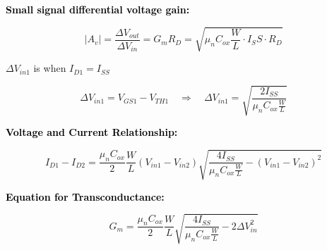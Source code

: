 \newpage

\noindent
\textbf{\textcolor{black}{Small signal differential voltage gain:}}
\begin{tcolorbox}[colback=white,colframe=black,title=]
\begin{equation}
|A_v| = \frac{\Delta V_{out}}{\Delta V_{in}} = G_m R_D = \sqrt{\mu_n C_{ox} \frac{W}{L} \cdot I_SS \cdot R_D}
\end{equation}
\end{tcolorbox}

\vspace{0.5cm}
\noindent
$\Delta V_{in1}$ is when $I_{D1} = I_{SS}$

\[
\Delta V_{in1} = V_{GS1} - V_{TH1}
\quad \Rightarrow \quad 
\Delta V_{in1} = \sqrt{\frac{2 I_{SS}}{\mu_n C_{ox} \frac{W}{L}}}
\]

\vspace{0.3cm}
\textbf{\textcolor{black}{Voltage and Current Relationship:}}
\begin{tcolorbox}[colback=white,colframe=black,title=]
\begin{equation}
I_{D1} - I_{D2} = \frac{\mu_n C_{ox}}{2} \frac{W}{L}(V_{in1} - V_{in2})
\sqrt{\frac{4 I_{SS}}{\mu_n C_{ox} \frac{W}{L}} - (V_{in1} - V_{in2})^2}
\end{equation}
\end{tcolorbox}

\vspace{0.75cm}

\textbf{\textcolor{black}{Equation for Transconductance:}}
\begin{tcolorbox}[colback=white,colframe=black,title=]
\begin{equation}
G_m = \frac{\mu_n C_{ox}}{2} \frac{W}{L}
\sqrt{\frac{4 I_{SS}}{\mu_n C_{ox} \frac{W}{L}} - 2 \Delta V_{in}^2}
\end{equation}
\end{tcolorbox}

\vspace{1cm}

